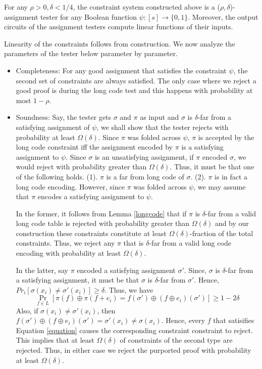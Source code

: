 \begin{lemma} \label{Tester} For any $\rho > 0,
  \delta < 1/4$, the constraint system constructed above is a ($\rho,
  \delta$)-assignment tester for any Boolean function $\psi : [s]
  \rightarrow \{0,1\}$. Moreover, the output circuits of the
  assignment testers compute linear functions of their inputs.
\end{lemma}
 Linearity of the constraints follows from
construction. We now analyze the parameters of the tester below
parameter by parameter.

\begin{itemize}

\item Completeness: For any good assignment that satisfies the
  constraint $\psi$, the second set of constraints are always
  satisfied. The only case where we reject a good proof is during the
  long code test and this happens with probability at most $1 - \rho$.

\item Soundness: Say, the tester gets $\sigma$ and $\pi$ as input and
  $\sigma$ is $\delta$-far from a satisfying assignment of $\psi$, we
  shall show that the tester rejects with probability at least
  $\Omega(\delta)$. Since $\pi$ was folded across $\psi$, $\pi$ is
  accepted by the long code constraint iff the assignment encoded by
  $\pi$ is a satisfying assignment to $\psi$. Since $\sigma$ is an
  unsatisfying assignment, if $\pi$ encoded $\sigma$, we would reject
  with probability greater than $\Omega(\delta)$. Thus, it must be
  that one of the following holds. (1). $\pi$ is a far from long code
  of $\sigma$. (2). $\pi$ is in fact a long code encoding. However,
  since $\pi$ was folded across $\psi$, we may assume that $\pi$
  encodes a satisfying assignment to $\psi$.

  In the former, it follows from Lemma \ref{longcode} that if $\pi$ is
  $\delta$-far from a valid long code table is rejected with
  probability greater than $\Omega(\delta)$ and by our construction
  these constraints constitute at least $\Omega(\delta)$-fraction of
  the total constraints. Thus, we reject any $\pi$ that is
  $\delta$-far from a valid long code encoding with probability at
  least $\Omega(\delta)$.

  In the latter, say $\pi$ encoded a satisfying assignment
  ${\sigma'}$. Since, $\sigma$ is $\delta$-far from a satisfying
  assignment, it must be that $\sigma$ is $\delta$-far from
  ${\sigma'}$. Hence, $Pr_i[\sigma(x_i) \ne \sigma'(x_i)] \ge
  \delta$. Thus, we have
\begin{equation}\label{equation}
   \Pr_{f \in L} \left[ \pi(f) \oplus \pi(f +e_i) = f(\sigma') \oplus (f \oplus e_i)(\sigma') \right] \ge 1 - 2\delta 
\end{equation}
Also, if $\sigma(x_i) \ne \sigma'(x_i)$, then $f(\sigma') \oplus (f
\oplus e_i)(\sigma') = \sigma'(x_i) \ne \sigma(x_i)$.  Hence, every
$f$ that satisifies Equation \eqref{equation} causes the corresponding
constraint constraint to reject. This implies that at least
$\Omega(\delta)$ of constraints of the second type are rejected. Thus,
in either case we reject the purported proof with probability at least
$\Omega(\delta)$.



\end{itemize}
